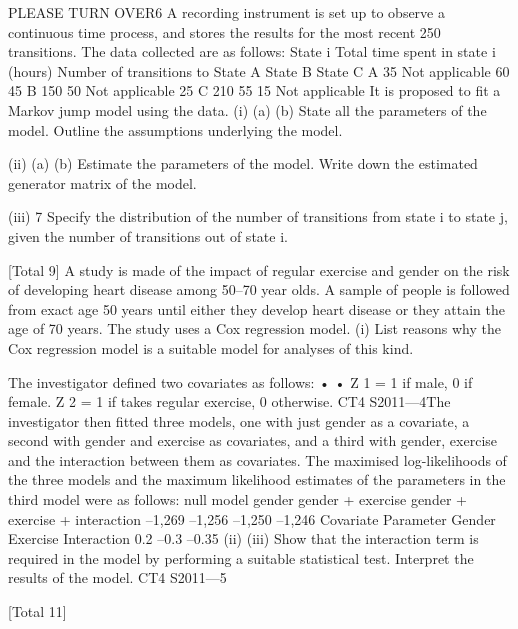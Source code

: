 \documentclass[a4paper,12pt]{article}
\begin{document}
\begin{enumerate}
PLEASE TURN OVER6
A recording instrument is set up to observe a continuous time process, and stores the
results for the most recent 250 transitions. The data collected are as follows:
State
i Total time
spent in
state i
(hours)
Number of transitions to
State A
State B
State C
A 35 Not
applicable 60 45
B 150 50 Not
applicable 25
C 210 55 15 Not
applicable
It is proposed to fit a Markov jump model using the data.
(i)
(a)
(b)
State all the parameters of the model.
Outline the assumptions underlying the model.

(ii)
(a)
(b)
Estimate the parameters of the model.
Write down the estimated generator matrix of the model.

(iii)
7
Specify the distribution of the number of transitions from state i to state j,
given the number of transitions out of state i.

[Total 9]
A study is made of the impact of regular exercise and gender on the risk of
developing heart disease among 50–70 year olds. A sample of people is followed from
exact age 50 years until either they develop heart disease or they attain the age of 70
years. The study uses a Cox regression model.
(i)
List reasons why the Cox regression model is a suitable model for analyses of
this kind.

The investigator defined two covariates as follows:
•
•
Z 1 = 1 if male, 0 if female.
Z 2 = 1 if takes regular exercise, 0 otherwise.
CT4 S2011—4The investigator then fitted three models, one with just gender as a covariate, a second
with gender and exercise as covariates, and a third with gender, exercise and the interaction between them as covariates. The maximised log-likelihoods of the three
models and the maximum likelihood estimates of the parameters in the third model
were as follows:
null model
gender
gender + exercise
gender + exercise + interaction –1,269
–1,256
–1,250
–1,246
Covariate Parameter
Gender
Exercise
Interaction 0.2
–0.3
–0.35
(ii)
(iii)
Show that the interaction term is required in the model by performing a
suitable statistical test.
Interpret the results of the model.
CT4 S2011—5


[Total 11]










\end{enumerate}
\end{document}
